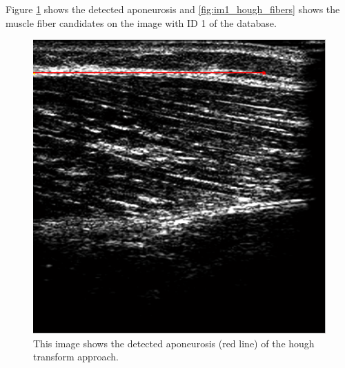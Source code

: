 \documentclass[10pt,twocolumn,letterpaper]{article}
\begin{document}
Figure \ref{fig:im1_hough_apo} shows the detected aponeurosis and \ref{fig:im1_hough_fibers} shows the muscle fiber candidates on the image with ID 1 of the database.

\begin{figure}
	\begin{center}		
		\includegraphics[width=1\linewidth]{img/im1_hough_apo}
	\end{center}
	\caption{This image shows the detected aponeurosis (red line) of the hough transform approach.}
	\label{fig:im1_hough_apo}
	
\end{figure}
\end{document}
